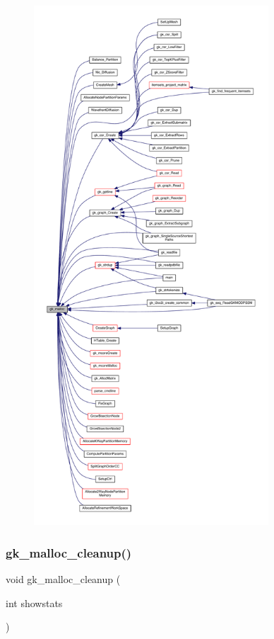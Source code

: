 \begin{figure}[H]
\begin{center}
\leavevmode
\includegraphics[height=550pt]{a00077_aba6f76f5c67b9b7e9c2e45988d3d3e9d_icgraph}
\end{center}
\end{figure}
\mbox{\label{a00077_a47156a22528b5bc8c7c6e9849af34e62}} 
\subsubsection{\texorpdfstring{gk\+\_\+malloc\+\_\+cleanup()}{gk\_malloc\_cleanup()}}
{\footnotesize\ttfamily void gk\+\_\+malloc\+\_\+cleanup (\begin{DoxyParamCaption}\item[{int}]{showstats }\end{DoxyParamCaption})}

